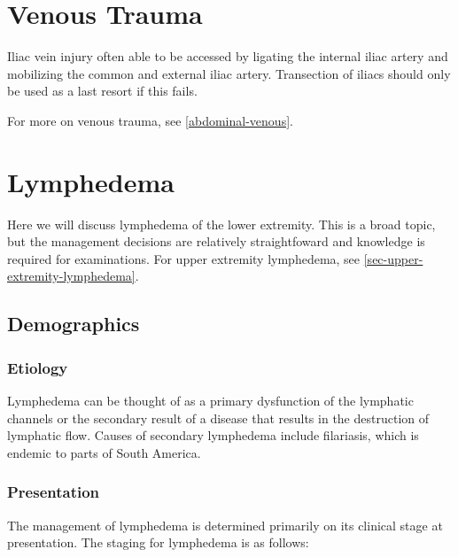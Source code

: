 \documentclass[
]{book}
\begin{document}
\hypertarget{venous-trauma}{%
\section{Venous Trauma}\label{venous-trauma}}

Iliac vein injury often able to be accessed by ligating the internal
iliac artery and mobilizing the common and external iliac artery.
Transection of iliacs should only be used as a last resort if this
fails. \citep{leeIliacVesselInjuries2002}

For more on venous trauma, see \ref{abdominal-venous}.

\hypertarget{lymphedema}{%
\section{Lymphedema}\label{lymphedema}}

Here we will discuss lymphedema of the lower extremity. This is a broad
topic, but the management decisions are relatively straightfoward and
knowledge is required for examinations. For upper extremity lymphedema,
see \ref{sec-upper-extremity-lymphedema}.

\hypertarget{demographics-6}{%
\subsection{Demographics}\label{demographics-6}}

\hypertarget{etiology-12}{%
\subsubsection{Etiology}\label{etiology-12}}

Lymphedema can be thought of as a primary dysfunction of the lymphatic
channels or the secondary result of a disease that results in the
destruction of lymphatic flow. Causes of secondary lymphedema include
filariasis, which is endemic to parts of South America.\citep{pfarr2009, shenoy2008}

\hypertarget{presentation-14}{%
\subsubsection{Presentation}\label{presentation-14}}

The management of lymphedema is determined primarily on its clinical
stage at presentation.\citep{grada2017} The staging for lymphedema is as
follows:
\end{document}
